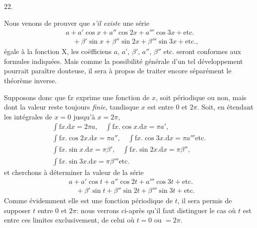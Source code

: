 \par{}\bigskip
{}
\begin{center}22.\end{center}
\begingroup
\makeatletter\tagsleft@true\let\veqno\@@leqno\makeatother
\setlength{\lineskip}{4pt}\setlength{\lineskiplimit}{4pt}
\noindent\hspace*{\parindent}Nous venons de prouver que \textit{s’il existe} une série
\[
\begin{aligned}
&a+a'\cos x+a''\cos2x+a'''\cos3x+\text{etc.}\\
&\quad{}+\beta'\sin x+\beta''\sin2x+\beta'''\sin3x+\text{etc.,}
\end{aligned}
\]
\noindent égale à la fonction \(\mathrm{X}\), les coëfficiens \(a\), \(a'\), \(\beta'\), \(a''\), \(\beta''\) etc. seront conformes aux formules indiquées. Mais comme la possibilité générale d’un tel développement pourrait paraître douteuse, il sera à propos de traiter encore séparément le théorème inverse.
\par
Supposons donc que \(\mathrm{f}x\) exprime une fonction de \(x\), soit périodique ou non, mais dont la valeur reste toujours \textit{finie}, tandisque \(x\) est entre \(0\) et \(2\pi\). Soit, en étendant les intégrales de \(x=0\) jusqu’à \(x=2\pi\),
\[
\begin{gathered}
\int\mathrm{f}x.\mathrm{d}x=2\pi a,\quad\int\mathrm{f}x.\cos x.\mathrm{d}x=\pi a',\\[3pt]
\int\mathrm{f}x.\cos2x.\mathrm{d}x=\pi a'',\quad\int\mathrm{f}x.\cos3x.\mathrm{d}x=\pi a'''\text{etc.}\\[3pt]
\int\mathrm{f}x.\sin x.\mathrm{d}x=\pi\beta',\quad\int\mathrm{f}x.\sin2x.\mathrm{d}x=\pi\beta'',\\[3pt]
\int\mathrm{f}x.\sin3x.\mathrm{d}x=\pi\beta'''\text{etc.}
\end{gathered}
\]
\noindent et cherchons à déterminer la valeur de la série
\[
\tag*{(T)}\begin{aligned}
&a+a'\cos t+a''\cos2t+a'''\cos3t+\text{etc.}\\
&\quad{}+\beta'\sin t+\beta''\sin2t+\beta'''\sin3t+\text{etc.}
\end{aligned}
\]
\noindent Comme évidemment elle est une fonction périodique de \(t\), il sera permis de supposer \(t\) entre \(0\) et \(2\pi\): nous verrons ci-après qu’il faut distinguer le cas où \(t\) est entre ces limites exclusivement, de celui où \(t=0\) ou \(=2\pi\).
